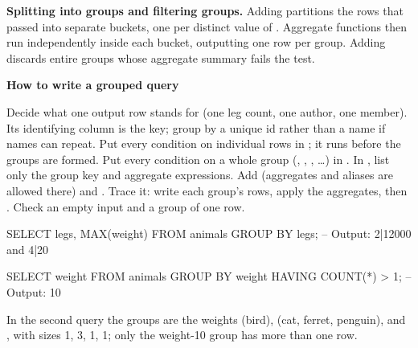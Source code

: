 \documentclass[10pt]{scrartcl}
\newenvironment{howto}[1]{\begin{mdframed}[style=howtostyle]{\color{NavyBlue}\textbf{#1}}\par\vspace{2pt}}{\end{mdframed}}
\begin{document}
\medskip\noindent\textbf{Splitting into groups and filtering groups.} Adding  partitions the rows that passed  into separate buckets, one per distinct value of . Aggregate functions then run independently inside each bucket, outputting one row per group. Adding  discards entire groups whose aggregate summary fails the test.
\begin{howto}{How to write a grouped query}
\begin{steps}
  \ii Decide what one output row stands for (one leg count, one author, one member). Its identifying column is the  key; group by a unique id rather than a name if names can repeat.
  \ii Put every condition on individual rows in ; it runs before the groups are formed.
  \ii Put every condition on a whole group (, , , \dots) in .
  \ii In , list only the group key and aggregate expressions.
  \ii Add  (aggregates and aliases are allowed there) and .
  \ii Trace it: write each group's rows, apply the aggregates, then . Check an empty input and a group of one row.
\end{steps}
\end{howto}
\begin{example*}
\begin{sql}
SELECT legs, MAX(weight) FROM animals GROUP BY legs;
-- Output: 2|12000  and  4|20

SELECT weight FROM animals GROUP BY weight HAVING COUNT(*) > 1;
-- Output: 10
\end{sql}
In the second query the groups are the weights  (bird),  (cat, ferret, penguin),  and , with sizes 1, 3, 1, 1; only the weight-10 group has more than one row.
\end{example*}
\end{document}
